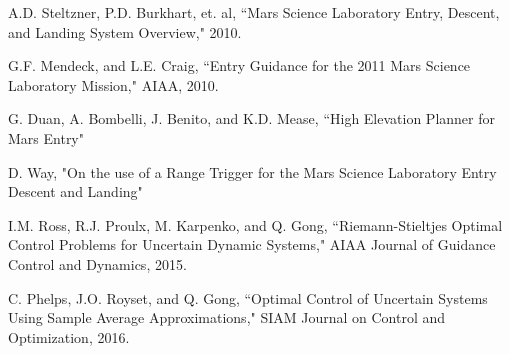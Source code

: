 \documentclass[10pt,a4paper]{article}
\begin{document}
	\begin{thebibliography}{1}
		

		A.D. Steltzner, P.D. Burkhart, et. al, ``Mars Science Laboratory Entry, Descent, and Landing System Overview," 2010.
				
		G.F. Mendeck, and L.E. Craig, ``Entry Guidance for the 2011 Mars Science Laboratory Mission," AIAA, 2010.
		
		G. Duan, A. Bombelli, J. Benito, and K.D. Mease, ``High Elevation Planner for Mars Entry"
		
		D. Way, "On the use of a Range Trigger for the Mars Science Laboratory Entry Descent and Landing"
		
		I.M. Ross, R.J. Proulx, M. Karpenko, and Q. Gong, ``Riemann-Stieltjes Optimal Control Problems for Uncertain Dynamic Systems," AIAA Journal of Guidance Control and Dynamics, 2015.
		
		C. Phelps, J.O. Royset, and Q. Gong, ``Optimal Control of Uncertain Systems Using Sample Average Approximations," SIAM Journal on Control and Optimization, 2016.
	\end{thebibliography}
\end{document}
